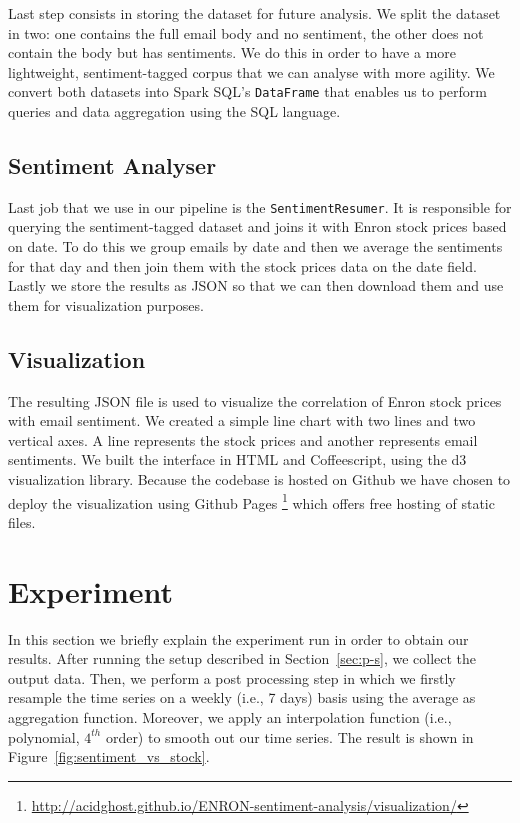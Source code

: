 \documentclass{vldb}
\begin{document}
Last step consists in storing the dataset for future analysis. We split the
dataset in two: one contains the full email body and no sentiment, the other
does not contain the body but has sentiments. We do this in order to have a more
lightweight, sentiment-tagged corpus that we can analyse with more agility. We
convert both datasets into Spark SQL's \texttt{DataFrame} that enables us to
perform queries and data aggregation using the SQL language.

\subsection{Sentiment Analyser}
\label{sub-sec:sentiment-analyser}
Last job that we use in our pipeline is the \texttt{SentimentResumer}. It is
responsible for querying the sentiment-tagged dataset and joins it with Enron
stock prices based on date. To do this we group emails by date and then we
average the sentiments for that day and then join them with the stock prices
data on the date field. Lastly we store the results as JSON so that we can
then download them and use them for visualization purposes.

\subsection{Visualization}
\label{sub-sec:visualization}
The resulting JSON file is used to visualize the correlation of Enron stock
prices with email sentiment. We created a simple line chart with two lines and
two vertical axes. A line represents the stock prices and another represents
email sentiments. We built the interface in HTML and Coffeescript, using the d3
visualization library. Because the codebase is hosted on Github we have chosen
to deploy the visualization using Github Pages
\footnote{\url{http://acidghost.github.io/ENRON-sentiment-analysis/visualization/}}
which offers free hosting of static files.

\section{Experiment}
\label{sec:exp}
In this section we briefly explain the experiment run in order to obtain our results.
After running the setup described in Section~\ref{sec:p-s}, we collect the output data.
Then, we perform a post processing step in which we firstly resample the time series on a weekly (i.e., 7 days) basis using the average as aggregation function.
Moreover, we apply an interpolation function (i.e., polynomial, $4^{th}$ order) to smooth out our time series.
The result is shown in Figure~\ref{fig:sentiment_vs_stock}.
\end{document}
